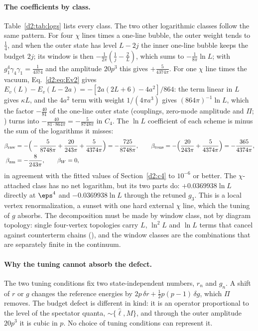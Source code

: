 \paragraph{The coefficients by class.} Table~\ref{d2:tab:logs} lists every class. The two other logarithmic classes follow the
same pattern. For four $\chi$ lines times a one-line bubble, the outer weight tends to $\frac14$, and when the outer state has level
$L-2j$ the inner one-line bubble keeps the budget $2j$; its window is then $-\frac1{2\pi}(\frac1j-\frac2L)$, which sums to
$-\frac1{8\pi}\ln L$; with
$g_1^4\gamma_4\gamma_1=\frac1{4374}$ and the amplitude $20p^3$ this gives $+\frac5{4374\pi}$. For one $\chi$ line times the vacuum,
Eq.~\eqref{d2:eq:Ev2} gives $E_v(L)-E_v(L-2a)=-[2a(2L+6)-4a^2]/864$: the term linear in $L$ gives $\kappa L$, and the
$4a^2$ term with weight $1/(4\pi a^3)$ gives $(864\pi)^{-1}\ln L$, which the factor $-\frac{40}{81}$ of the one-line outer state (couplings,
zero-mode amplitude and $\Pi$; ) turns into $-\frac{40}{81\cdot864\pi}=-\frac5{8748\pi}$ in $C_4$. The $\ln L$ coefficient of each scheme is minus the sum of the logarithms it misses:
\begin{align}
 \beta_{\rm raw}&=-\Big(-\frac5{8748\pi}+\frac{20}{243\pi}+\frac5{4374\pi}\Big)=-\frac{725}{8748\pi},\qquad
 \beta_{\rm cons}=-\Big(\frac{20}{243\pi}+\frac5{4374\pi}\Big)=-\frac{365}{4374\pi},\nonumber\\
 \beta_{\rm zm}&=-\frac8{243\pi},\qquad \beta_W=0 ,
\end{align}
in agreement with the fitted values of Section~\ref{d2:c4} to $10^{-6}$ or better. The $\chi$-attached class has no net
logarithm, but its two parts do: $+0.0369938\ln L$ directly at $\eps^4$ and $-0.0369938\ln L$ through the retuned $g_3$. This
is a local vertex renormalization, a sunset with one hard external $\chi$ line, which the tuning of $g$ absorbs. The
decomposition must be made by window class, not by diagram topology: single four-vertex topologies carry $L$, $\ln^2L$ and
$\ln L$ terms that cancel against counterterm chains (), and the window classes are the combinations that
are separately finite in the continuum.

\paragraph{Why the tuning cannot absorb the defect.} The two tuning conditions fix two state-independent numbers, $r_n$ and
$g_n$. A shift of $r$ or $g$ changes the reference energies by $2p\,\delta r+\frac12p(p-1)\,\delta g$, which $\Pi$ removes.
The budget defect is different in kind: it is an operator proportional to the level of the spectator quanta,
${\sim}\{\hat\ell,M\}$, and through the outer amplitude $20p^3$ it is cubic in $p$. No choice of tuning conditions can
represent it.

